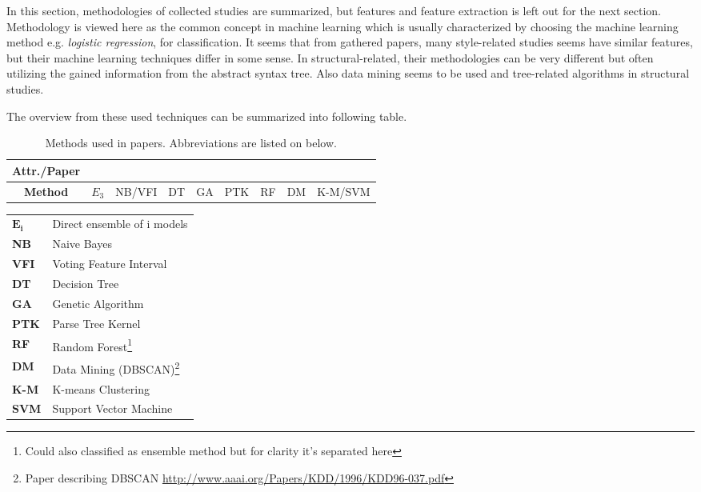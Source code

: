 \documentclass[english]{tktltiki2}
\theoremstyle{definition}
\theoremstyle{remark}
\begin{document}
In this section, methodologies of collected studies are summarized, but features and feature extraction is left out for the next section. Methodology is viewed here as the common concept in machine learning which is usually characterized by choosing the machine learning method e.g. \textit{logistic regression}, for classification. It seems that from gathered papers, many style-related studies seems have similar features, but their machine learning techniques differ in some sense. In structural-related, their methodologies can be very different but often utilizing the gained information from the abstract syntax tree. Also data mining seems to be used and tree-related algorithms in structural studies.  

The overview from these used techniques can be summarized into following table.

\begin{table}[ht]
\centering
\begin{tabular}{c|cccccccc}
\textbf{Attr./Paper} & \cite{bandara2011machine}   & \cite{kothari2007probabilistic}   & \cite{Elenbogen:2008:DOS:1295109.1295123}  & \cite{lange2007using}    & \cite{Son:2013:APS:2508269.2508323}   & \cite{caliskan2015anonymizing}    & \cite{jadalla2008pde4java}   & \cite{rosenblum2011wrote}   \\ \hline
\textbf{Method}        & $E_3$ & NB/VFI & DT & GA & PTK & RF  & DM & K-M/SVM \\
\end{tabular}
\caption{Methods used in papers. Abbreviations are listed on below.}
\label{table:meth}
\end{table}

\begin{longtable}{ll}

{$\mathbf{E_i}$} & Direct ensemble of i models \\
\textbf{NB} & Naive Bayes\\
\textbf{VFI} & Voting Feature Interval\\
\textbf{DT} & Decision Tree\\
\textbf{GA} & Genetic Algorithm\\
\textbf{PTK} & Parse Tree Kernel\\
\textbf{RF} & Random Forest\footnote{Could also classified as ensemble method but for clarity it's separated here}\\
\textbf{DM} & Data Mining (DBSCAN)\footnote{Paper describing DBSCAN \url{http://www.aaai.org/Papers/KDD/1996/KDD96-037.pdf}}\\
\textbf{K-M} & K-means Clustering\\
\textbf{SVM} & Support Vector Machine

\end{longtable}
\end{document}
